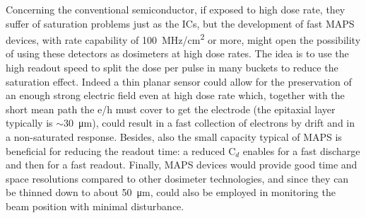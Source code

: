             Concerning the conventional semiconductor, if exposed to high dose rate, they suffer of saturation problems just as the ICs, but the development of fast MAPS devices, with rate capability of \SI{100}{MHz/cm\squared} or more, might open the possibility of using these detectors as dosimeters at high dose rates. 
            The idea is to use the high readout speed to split the dose per pulse in many buckets to reduce the saturation effect.
            Indeed a thin planar sensor could allow for the preservation of an enough strong electric field even at high dose rate which, together with the short mean path the e/h must cover to get the electrode (the epitaxial layer typically is $\sim$\SI{30}{\um}), could result in a fast collection of electrons by drift and in a non-saturated response.
            Besides, also the small capacity typical of MAPS is beneficial for reducing the readout time: a reduced C$_d$ enables for a fast discharge and then for a fast readout. 
            Finally, MAPS devices would provide good time and space resolutions compared to other dosimeter technologies, and since they can be thinned down to about \SI{50}{\um}, could also be employed in monitoring the beam position with minimal disturbance.
            
